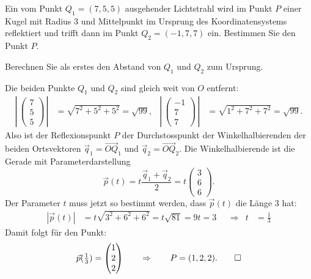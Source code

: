 Ein vom Punkt $Q_1=(7,5,5)$ ausgehender Lichtstrahl wird im Punkt $P$
einer Kugel mit Radius $3$ und Mittelpunkt im Ursprung des Koordinatensystems
reflektiert und trifft dann im Punkt $Q_2=(-1,7,7)$ ein.
Bestimmen Sie den Punkt $P$.
\begin{hinweis}
 Berechnen Sie als erstes den Abstand von $Q_1$ und $Q_2$ zum Ursprung.
\end{hinweis}


\begin{loesung}
Die beiden Punkte $Q_1$ und $Q_2$ sind gleich weit von $O$ entfernt:
\begin{align*}
\left|\,\begin{pmatrix} 7\\5\\5 \end{pmatrix} \,\right|
&=\sqrt{7^2+5^2+5^2}=\sqrt{99},
&
\left|\,\begin{pmatrix}-1\\7\\7 \end{pmatrix} \,\right|
&=\sqrt{1^2+7^2+7^2}=\sqrt{99}.
\end{align*}
Also ist der Reflexionspunkt $P$ der Durchstosspunkt der Winkelhalbierenden
der beiden Ortsvektoren $\vec q_1=\overrightarrow{OQ}_1$ und
$\vec q_2=\overrightarrow{OQ}_2$. Die Winkelhalbierende ist
die Gerade mit Parameterdarstellung
\[
\vec p(t)=t\frac{\vec q_1+\vec q_2}2=t\begin{pmatrix} 3\\6\\6 \end{pmatrix}.
\]
Der Parameter $t$ muss jetzt so bestimmt werden, dass $\vec p(t)$ die Länge
$3$ hat:
\begin{align*}
|\vec p(t)|&=t\sqrt{3^2+6^2+6^2}=t\sqrt{81}=9t=3
&&\Rightarrow&
t&=\frac13
\end{align*}
Damit folgt für den Punkt:
\[
\vec p({\textstyle\frac13})=\begin{pmatrix}1\\2\\2\end{pmatrix}
\qquad\Rightarrow\qquad
P=(1,2,2).
\qedhere
\]
\end{loesung}
